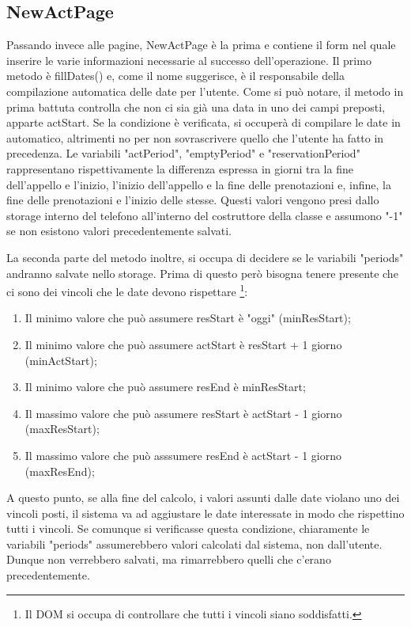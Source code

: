 \documentclass[Lau, oneside, noexaminfo]{sapthesis}%
\begin{document}
\subsection{NewActPage}
Passando invece alle pagine, NewActPage è la prima e contiene il form nel quale inserire le varie informazioni necessarie al successo dell'operazione. Il primo metodo è fillDates() e, come il nome suggerisce, è il responsabile della compilazione automatica delle date per l'utente. Come si può notare, il metodo in prima battuta controlla che non ci sia già una data in uno dei campi preposti, apparte actStart. Se la condizione è verificata, si occuperà di compilare le date in automatico, altrimenti no per non sovrascrivere quello che l'utente ha fatto in precedenza.
Le variabili "actPeriod", "emptyPeriod" e "reservationPeriod" rappresentano rispettivamente la differenza espressa in giorni tra la fine dell'appello e l'inizio, l'inizio dell'appello e la fine delle prenotazioni e, infine, la fine delle prenotazioni e l'inizio delle stesse. Questi valori vengono presi dallo storage interno del telefono all'interno del costruttore della classe e assumono "-1" se non esistono valori precedentemente salvati.

La seconda parte del metodo inoltre, si occupa di decidere se le variabili "periods" andranno salvate nello storage. Prima di questo però bisogna tenere presente che ci sono dei vincoli che le date devono rispettare \footnote{Il DOM si occupa di controllare che tutti i vincoli siano soddisfatti.}:
\begin{enumerate}
	\item Il minimo valore che può assumere resStart è "oggi" (minResStart);
	\item Il minimo valore che può assumere actStart è resStart + 1 giorno (minActStart);
	\item Il minimo valore che può assumere resEnd è minResStart;
	\item Il massimo valore che può assumere resStart è actStart - 1 giorno (maxResStart);
	\item Il massimo valore che può asssumere resEnd è  actStart - 1 giorno (maxResEnd);
\end{enumerate}
A questo punto, se alla fine del calcolo, i valori assunti dalle date violano uno dei vincoli posti, il sistema va ad aggiustare le date interessate in modo che rispettino tutti i vincoli. Se comunque si verificasse questa condizione, chiaramente le variabili "periods" assumerebbero valori calcolati dal sistema, non dall'utente. Dunque non verrebbero salvati, ma rimarrebbero quelli che c'erano precedentemente.
\end{document}
